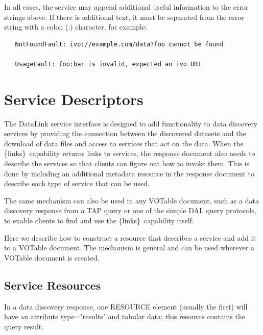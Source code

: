 \documentclass[11pt,a4paper]{ivoa}
\newcommand{\blinks}{\{links\}}
\begin{document}
In all cases, the service may append additional useful information to the
error strings above.
If there is additional text, it must be separated
from the error string with a colon (:) character, for example:
\begin{verbatim}
   NotFoundFault: ivo://example.com/data?foo cannot be found

   UsageFault: foo:bar is invalid, expected an ivo URI 
\end{verbatim}


\section{Service Descriptors}

The DataLink service interface is designed to add functionality to data
discovery services by providing the connection between the discovered
datasets and the download of data files and access to services that act
on the data. When the \blinks\ capability returns links to services, the
response document also needs to describe the services so that clients can
figure out how to invoke them. This is done by including an additional
metadata resource in the response document to describe each type of
service that can be used.

The same mechanism can also be used in any VOTable document, such
as a data discovery response from a TAP query or one of the simple
DAL query protocols, to enable clients to find and use the \blinks\
capability itself.

Here we describe how to construct a resource that describes a service
and add it to a VOTable document. The mechanism is general and can be
used wherever a VOTable document is created.


\subsection{Service Resources}

In a data discovery response, one RESOURCE element (usually the first)
will have an attribute type="results" and tabular data; this resource
contains the query result.
\end{document}

